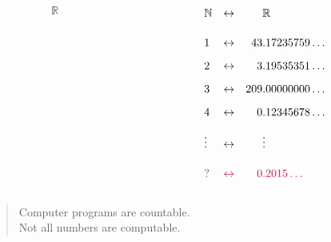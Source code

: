 \begin{frame}
  \begin{columns}
    \begin{column}{0.3\textwidth}
      \color{gmitblue} \fontsize{60}{10}
      \[\mathbb{R}\]
    \end{column}
    {\color{gmitgrey!30}\vrule{}} \hspace{0.1\textwidth}
    \begin{column}{0.5\textwidth}
      \begin{align*}
        &\mathbb{N} &\leftrightarrow& &&\mathbb{R} \\[4mm]
        &1 &\leftrightarrow& &43&.17235759\ldots \\[2mm]
        &2 &\leftrightarrow& &3&.19535351\ldots \\[2mm]
        &3 &\leftrightarrow& &209&.00000000\ldots \\[2mm]
        &4 &\leftrightarrow& &0&.12345678\ldots \\[2mm]
        &\vdots &\leftrightarrow& &&\vdots \\[4mm]
        &{\color{gmitred}?} &{\color{gmitred}\leftrightarrow}& &{\color{gmitred}0}&{\color{gmitred}.2015\ldots}
      \end{align*}
    \end{column}
  \end{columns}
\end{frame}


\begin{frame}[standout]
  \begin{quote}
    Computer programs are countable. \\[8mm]
    Not all numbers are computable.
  \end{quote}
\end{frame}